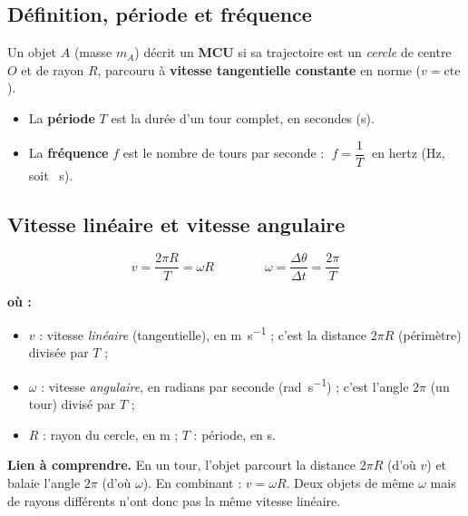 \documentclass[11pt,a4paper]{article}
\newenvironment{ou}{%
  \par\smallskip\noindent\textbf{où :}\nopagebreak
  \begin{itemize}[leftmargin=1.8em,topsep=2pt,itemsep=1.5pt,parsep=0pt]}%
  {\end{itemize}}
\begin{document}
\subsection{Définition, période et fréquence}

\begin{definition}
Un objet $A$ (masse $m_A$) décrit un \textbf{MCU} si sa trajectoire est un \emph{cercle} de centre $O$
et de rayon $R$, parcouru à \textbf{vitesse tangentielle constante} en norme ($v=\text{cte}$).
\end{definition}

\begin{definition}
\begin{itemize}[leftmargin=1.6em,topsep=2pt,itemsep=1.5pt]
  \item La \textbf{période} $T$ est la durée d'un tour complet, en secondes (\si{\second}).
  \item La \textbf{fréquence} $f$ est le nombre de tours par seconde : $\;f=\dfrac{1}{T}\;$ en hertz (\si{\hertz}, soit \si{\per\second}).
\end{itemize}
\end{definition}

\subsection{Vitesse linéaire et vitesse angulaire}

\begin{formule}
\[ \boxed{v=\frac{2\pi R}{T}=\omega R}\qquad\qquad \boxed{\omega=\frac{\Delta\theta}{\Delta t}=\frac{2\pi}{T}} \]
\begin{ou}
  \item $v$ : vitesse \emph{linéaire} (tangentielle), en \si{\metre\per\second} ; c'est la distance $2\pi R$ (périmètre) divisée par $T$ ;
  \item $\omega$ : vitesse \emph{angulaire}, en radians par seconde (\si{\radian\per\second}) ; c'est l'angle $2\pi$ (un tour) divisé par $T$ ;
  \item $R$ : rayon du cercle, en \si{\metre} ; \quad $T$ : période, en \si{\second}.
\end{ou}
\end{formule}

\noindent\textbf{Lien à comprendre.} En un tour, l'objet parcourt la distance $2\pi R$ (d'où $v$) et
balaie l'angle $2\pi$ (d'où $\omega$). En combinant : $v=\omega R$. Deux objets de même $\omega$ mais
de rayons différents n'ont donc pas la même vitesse linéaire.
\end{document}
